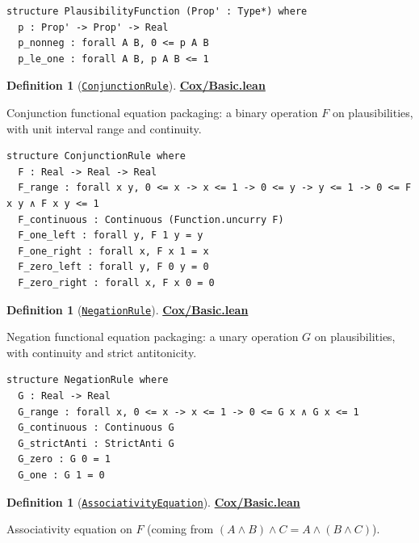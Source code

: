 \documentclass[11pt]{article}
\theoremstyle{definition}
\newtheorem{definition}[theorem]{Definition}
\theoremstyle{remark}
\begin{document}
\begin{lstlisting}[caption={Cox plausibility function interface}]
structure PlausibilityFunction (Prop' : Type*) where
  p : Prop' -> Prop' -> Real
  p_nonneg : forall A B, 0 <= p A B
  p_le_one : forall A B, p A B <= 1
\end{lstlisting}

\begin{definition}[\href{https://github.com/zariuq/ks-foundations-of-inference/blob/main/ProbabilityTheory/Cox/Basic.lean}{\texttt{ConjunctionRule}}]
\textbf{\href{https://github.com/zariuq/ks-foundations-of-inference/blob/main/ProbabilityTheory/Cox/Basic.lean}{Cox/Basic.lean}}

Conjunction functional equation packaging: a binary operation $F$ on plausibilities, with unit interval
range and continuity.
\end{definition}

\begin{lstlisting}[caption={Cox conjunction rule interface}]
structure ConjunctionRule where
  F : Real -> Real -> Real
  F_range : forall x y, 0 <= x -> x <= 1 -> 0 <= y -> y <= 1 -> 0 <= F x y ∧ F x y <= 1
  F_continuous : Continuous (Function.uncurry F)
  F_one_left : forall y, F 1 y = y
  F_one_right : forall x, F x 1 = x
  F_zero_left : forall y, F 0 y = 0
  F_zero_right : forall x, F x 0 = 0
\end{lstlisting}

\begin{definition}[\href{https://github.com/zariuq/ks-foundations-of-inference/blob/main/ProbabilityTheory/Cox/Basic.lean}{\texttt{NegationRule}}]
\textbf{\href{https://github.com/zariuq/ks-foundations-of-inference/blob/main/ProbabilityTheory/Cox/Basic.lean}{Cox/Basic.lean}}

Negation functional equation packaging: a unary operation $G$ on plausibilities, with continuity and
strict antitonicity.
\end{definition}

\begin{lstlisting}[caption={Cox negation rule interface}]
structure NegationRule where
  G : Real -> Real
  G_range : forall x, 0 <= x -> x <= 1 -> 0 <= G x ∧ G x <= 1
  G_continuous : Continuous G
  G_strictAnti : StrictAnti G
  G_zero : G 0 = 1
  G_one : G 1 = 0
\end{lstlisting}

\begin{definition}[\href{https://github.com/zariuq/ks-foundations-of-inference/blob/main/ProbabilityTheory/Cox/Basic.lean}{\texttt{AssociativityEquation}}]
\textbf{\href{https://github.com/zariuq/ks-foundations-of-inference/blob/main/ProbabilityTheory/Cox/Basic.lean}{Cox/Basic.lean}}

Associativity equation on $F$ (coming from $(A\wedge B)\wedge C = A\wedge(B\wedge C)$).
\end{definition}
\end{document}
